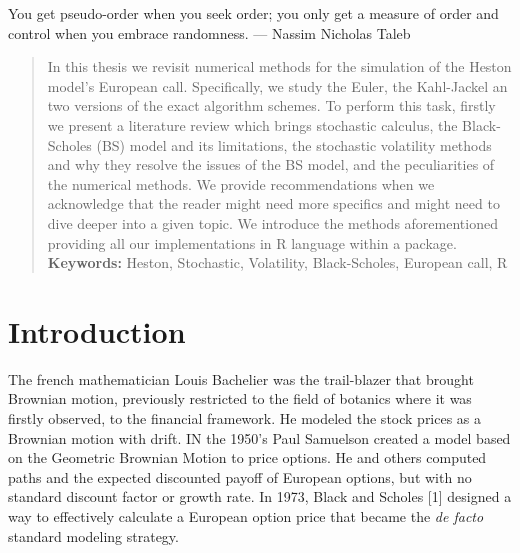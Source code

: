 \documentclass[12pt,twoside]{reedthesis}
\theoremstyle{definition}
\theoremstyle{definition}
\theoremstyle{remark}
\begin{document}
\begin{acknowledgements}

      You get pseudo-order when you seek order; you only get a measure of
      order and control when you embrace randomness. --- Nassim Nicholas Taleb
    \end{acknowledgements}
  
      \hypersetup{linkcolor=black}
    \setcounter{tocdepth}{2}
    \tableofcontents
  
      \listoftables
  
      \listoffigures
      \begin{abstract}
      In this thesis we revisit numerical methods for the simulation of the
      Heston model's European call. Specifically, we study the Euler, the
      Kahl-Jackel an two versions of the exact algorithm schemes. To perform
      this task, firstly we present a literature review which brings
      stochastic calculus, the Black-Scholes (BS) model and its limitations,
      the stochastic volatility methods and why they resolve the issues of the
      BS model, and the peculiarities of the numerical methods. We provide
      recommendations when we acknowledge that the reader might need more
      specifics and might need to dive deeper into a given topic. We introduce
      the methods aforementioned providing all our implementations in R
      language within a package. \newline \newline \textbf{Keywords:} Heston,
      Stochastic, Volatility, Black-Scholes, European call, R
    \end{abstract}
  
  \mainmatter %
  \pagestyle{fancyplain} %

  \newcommand{\source}[1]{\caption*{Source: {#1}} }
  
  
  
  \chapter{Introduction}\label{intro}
  
  The french mathematician Louis Bachelier was the trail-blazer that
  brought Brownian motion, previously restricted to the field of botanics
  where it was firstly observed, to the financial framework. He modeled
  the stock prices as a Brownian motion with drift. IN the 1950's Paul
  Samuelson created a model based on the Geometric Brownian Motion to
  price options. He and others computed paths and the expected discounted
  payoff of European options, but with no standard discount factor or
  growth rate. In 1973, Black and Scholes {[}1{]} designed a way to
  effectively calculate a European option price that became the \emph{de
  facto} standard modeling strategy.
  
\end{document}
